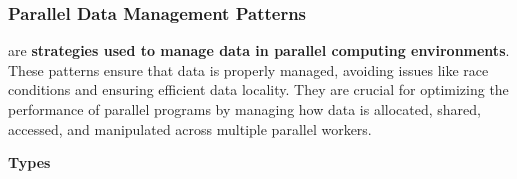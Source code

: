 \subsubsection{Parallel Data Management Patterns}

 are \textbf{strategies used to manage data in parallel computing environments}. These patterns ensure that data is properly managed, avoiding issues like race conditions and ensuring efficient data locality. They are crucial for optimizing the performance of parallel programs by managing how data is allocated, shared, accessed, and manipulated across multiple parallel workers.

\highspace
\begin{flushleft}
    \textcolor{Green3}{ \textbf{Types}}
\end{flushleft}
